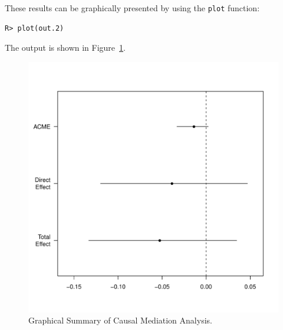 \documentclass[11pt,letterpaper]{article}
\theoremstyle{plain}
\begin{document}
These results can be graphically presented by using the {\tt plot} function:
\begin{verbatim}
R> plot(out.2)
\end{verbatim}
The output is shown in Figure~\ref{fig:plot.mediate}.

\begin{figure}[t]
\vspace{-.5in}
\begin{center}
\includegraphics[scale=.5]{plot-mediate.pdf}
\end{center}
\vspace{-.5in}
\caption{Graphical Summary of Causal Mediation Analysis.
  \label{fig:plot.mediate}}
\end{figure}
\end{document}
